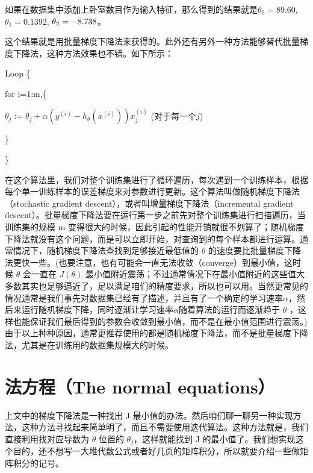 \documentclass[UTF8]{ctexart}
\begin{document}
		如果在数据集中添加上卧室数目作为输入特征，那么得到的结果就是$ \theta_{0} = 89.60$, $\theta_{1} = 0.1392$, $\theta_{2} = \--8.738$。
		
		这个结果就是用批量梯度下降法来获得的。此外还有另外一种方法能够替代批量梯度下降法，这种方法效果也不错。如下所示：
		
		\par Loop \{
			\par \setlength \parindent{2em} for i=1:m,\{ 
				\begin{center}
					$ \theta_{j} := \theta_{j} + \alpha (y^{(i)} - h_{\theta}(x^{(i)}))x_{j}^{(i)}$
				(对于每一个$j$)
				\end{center}
			\par \setlength \parindent{2em} \}
		\par \}
		
		在这个算法里，我们对整个训练集进行了循环遍历，每次遇到一个训练样本，根据每个单一训练样本的误差梯度来对参数进行更新。这个算法叫做随机梯度下降法（stochastic gradient descent），或者叫增量梯度下降法（incremental gradient descent）。批量梯度下降法要在运行第一步之前先对整个训练集进行扫描遍历，当训练集的规模 m 变得很大的时候，因此引起的性能开销就很不划算了；随机梯度下降法就没有这个问题，而是可以立即开始，对查询到的每个样本都进行运算。通常情况下，随机梯度下降法查找到足够接近最低值的 $ \theta $ 的速度要比批量梯度下降法更快一些。(也要注意，也有可能会一直无法收敛（converge）到最小值，这时候 $ \theta $ 会一直在 $ J( \theta )$ 最小值附近震荡；不过通常情况下在最小值附近的这些值大多数其实也足够逼近了，足以满足咱们的精度要求，所以也可以用。当然更常见的情况通常是我们事先对数据集已经有了描述，并且有了一个确定的学习速率$\alpha$，然后来运行随机梯度下降，同时逐渐让学习速率$\alpha$随着算法的运行而逐渐趋于 $ \theta $ ，这样也能保证我们最后得到的参数会收敛到最小值，而不是在最小值范围进行震荡。) 由于以上种种原因，通常更推荐使用的都是随机梯度下降法，而不是批量梯度下降法，尤其是在训练用的数据集规模大的时候。 
		
		\section{法方程（The normal equations） }
		上文中的梯度下降法是一种找出 J 最小值的办法。然后咱们聊一聊另一种实现方法，这种方法寻找起来简单明了，而且不需要使用迭代算法。这种方法就是，我们直接利用找对应导数为 $ \theta $ 位置的 $ \theta_{j} $，这样就能找到 J 的最小值了。我们想实现这个目的，还不想写一大堆代数公式或者好几页的矩阵积分，所以就要介绍一些做矩阵积分的记号。
		
\end{document}
